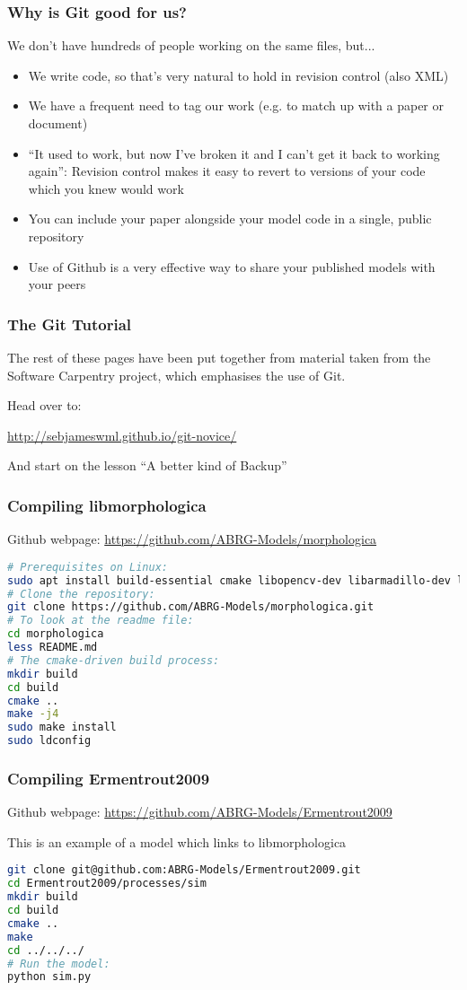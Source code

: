 \documentclass{beamer}
\begin{document}
\begin{frame}
  \frametitle{Why is Git good for us?}
  We don't have hundreds of people working on the same files, but...
  \begin{itemize}
    \pause \item We write code, so that's very natural to hold in
    revision control (also XML)
    \pause \item We have a frequent need to \alert{tag} our work (e.g. to
    match up with a paper or document)
    \pause \item ``It used to work, but now I've broken it and I can't
    get it back to working again'': Revision control makes it easy to
    revert to versions of your code which you knew would work
    \pause \item You can include your paper alongside your model code
    in a single, public repository
    \pause \item Use of Github is a very effective way to share your
    published models with your peers
  \end{itemize}
\end{frame}

\begin{frame}
  \frametitle{The Git Tutorial}
  The rest of these pages have been put together from material taken
  from the Software Carpentry project, which emphasises the use of
  Git.

  Head over to:

  \url{http://sebjameswml.github.io/git-novice/}

  And start on the lesson ``A better kind of Backup''

\end{frame}

\begin{frame}[fragile]
  \frametitle{Compiling libmorphologica}
    Github webpage: \url{https://github.com/ABRG-Models/morphologica}

  \begin{lstlisting}[language=bash]
# Prerequisites on Linux:
sudo apt install build-essential cmake libopencv-dev libarmadillo-dev libglu1-mesa-dev libxmu-dev libxi-dev
# Clone the repository:
git clone https://github.com/ABRG-Models/morphologica.git
# To look at the readme file:
cd morphologica
less README.md
# The cmake-driven build process:
mkdir build
cd build
cmake ..
make -j4
sudo make install
sudo ldconfig\end{lstlisting}
\end{frame}

\begin{frame}[fragile]
  \frametitle{Compiling Ermentrout2009}
  Github webpage: \url{https://github.com/ABRG-Models/Ermentrout2009}

  This is an example of a model which links to libmorphologica
  \begin{lstlisting}[language=bash]
git clone git@github.com:ABRG-Models/Ermentrout2009.git
cd Ermentrout2009/processes/sim
mkdir build
cd build
cmake ..
make
cd ../../../
# Run the model:
python sim.py\end{lstlisting}
\end{frame}
\end{document}
